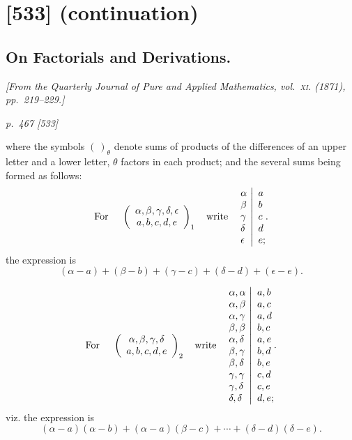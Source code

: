 \documentclass[11pt,a4paper]{article}
\makeatletter
\theoremstyle{plain}
\theoremstyle{definition}
\newcommand{\eps}{\epsilon}
\newcommand{\twocol}[2]{%
  \left.
  \begin{array}{@{}l@{}}
    #1
  \end{array}
  \ \right|\
  \begin{array}{@{}l@{}}
    #2
  \end{array}}
\makeatother
\begin{document}
\section{[533] (continuation)}
\subsection{On Factorials and Derivations.}

\begin{center}
\textit{[From the Quarterly Journal of Pure and Applied Mathematics, vol.~\textsc{xi}. (1871), pp.~219--229.]}
\end{center}

\bigskip
\textit{p.~467 [533]}
\smallskip

\noindent
where the symbols \((\ )_{\theta}\) denote sums of products of the differences of an upper letter
and a lower letter, \(\theta\) factors in each product; and the several sums being formed as
follows:
\[
\text{For }\quad
\left(\begin{array}{c}
\alpha,\beta,\gamma,\delta,\eps\\
a,b,c,d,e
\end{array}\right)_{1}
\quad\text{write}\quad
\twocol{\alpha\\ \beta\\ \gamma\\ \delta\\ \eps}{a\\ b\\ c\\ d\\ e;}.
\]
the expression is
\[
(\alpha-a)+(\beta-b)+(\gamma-c)+(\delta-d)+(\eps-e).
\]

\[
\text{For }\quad
\left(\begin{array}{c}
\alpha,\beta,\gamma,\delta\\
a,b,c,d,e
\end{array}\right)_{2}
\quad\text{write}\quad
\twocol{
\alpha,\alpha\\
\alpha,\beta\\
\alpha,\gamma\\
\beta,\beta\\
\alpha,\delta\\
\beta,\gamma\\
\beta,\delta\\
\gamma,\gamma\\
\gamma,\delta\\
\delta,\delta
}{
a,b\\
a,c\\
a,d\\
b,c\\
a,e\\
b,d\\
b,e\\
c,d\\
c,e\\
d,e;
}.
\]
viz. the expression is
\[
(\alpha-a)(\alpha-b)+(\alpha-a)(\beta-c)+\cdots+(\delta-d)(\delta-e).
\]
\end{document}
